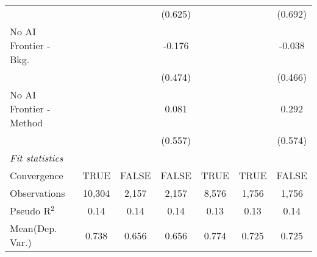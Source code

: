 \begin{tabular}{lcccccc}
                           &               &         & (0.625)     &               &         & (0.692)\\   
   No AI Frontier - Bkg.   &               &         & -0.176      &               &         & -0.038\\   
                           &               &         & (0.474)     &               &         & (0.466)\\   
   No AI Frontier - Method &               &         & 0.081       &               &         & 0.292\\   
                           &               &         & (0.557)     &               &         & (0.574)\\   
   \midrule
   \emph{Fit statistics}\\
   Convergence             &TRUE           & FALSE   & FALSE       & TRUE          & TRUE    & FALSE\\  
   Observations            & 10,304        & 2,157   & 2,157       & 8,576         & 1,756   & 1,756\\  
   Pseudo R$^2$            & 0.14          & 0.14    & 0.14        & 0.13          & 0.13    & 0.14\\  
Mean(Dep. Var.) & 0.738 & 0.656 & 0.656 & 0.774 & 0.725 & 0.725 \\
   

\end{tabular}
